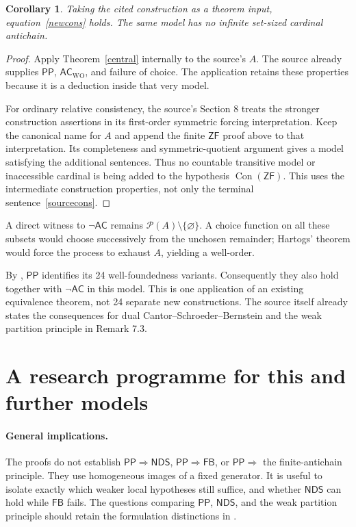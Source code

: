 \documentclass[11pt,a4paper]{article}
\newcommand{\ZF}{\mathsf{ZF}}
\newcommand{\AC}{\mathsf{AC}}
\newcommand{\ACWO}{\mathsf{AC}_{\mathrm{WO}}}
\newcommand{\PP}{\mathsf{PP}}
\newcommand{\NDS}{\mathsf{NDS}}
\newcommand{\FB}{\mathsf{FB}}
\newcommand{\Con}{\operatorname{Con}}
\newcommand{\calP}{\mathcal P}
\newtheorem{corollary}[theorem]{Corollary}
\theoremstyle{definition}
\theoremstyle{remark}
\begin{document}
\begin{corollary}\label{consistency}
Taking the cited construction as a theorem input, equation~\eqref{newcons} holds. The same model has no infinite set-sized cardinal antichain.
\end{corollary}
\begin{proof}
Apply Theorem~\ref{central} internally to the source's $A$. The source already supplies $\PP$, $\ACWO$, and failure of choice. The application retains these properties because it is a deduction inside that very model.

For ordinary relative consistency, the source's Section 8 treats the stronger construction assertions in its first-order symmetric forcing interpretation. Keep the canonical name for $A$ and append the finite $\ZF$ proof above to that interpretation. Its completeness and symmetric-quotient argument gives a model satisfying the additional sentences. Thus no countable transitive model or inaccessible cardinal is being added to the hypothesis $\Con(\ZF)$. This uses the intermediate construction properties, not only the terminal sentence~\eqref{sourcecons}.
\end{proof}

A direct witness to $\neg\AC$ remains $\calP(A)\setminus\{\varnothing\}$. A choice function on all these subsets would choose successively from the unchosen remainder; Hartogs' theorem would force the process to exhaust $A$, yielding a well-order.

By \cite[Proposition 9.8]{BK}, $\PP$ identifies its 24 well-foundedness variants. Consequently they also hold together with $\neg\AC$ in this model. This is one application of an existing equivalence theorem, not 24 separate new constructions. The source itself already states the consequences for dual Cantor--Schroeder--Bernstein and the weak partition principle in Remark 7.3.

\section{A research programme for this and further models}\label{research}

\paragraph{General implications.}
The proofs do not establish $\PP\Rightarrow\NDS$, $\PP\Rightarrow\FB$, or $\PP\Rightarrow$ the finite-antichain principle. They use homogeneous images of a fixed generator. It is useful to isolate exactly which weaker local hypotheses still suffice, and whether $\NDS$ can hold while $\FB$ fails. The questions comparing $\PP$, $\NDS$, and the weak partition principle should retain the formulation distinctions in \cite{BK}.
\end{document}
